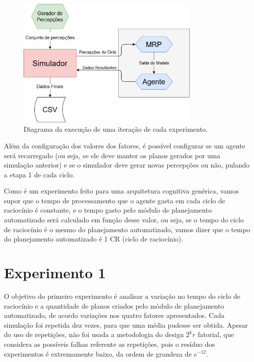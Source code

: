 \begin{figure}[h!]
    \centering
    \includegraphics[width=0.8\textwidth]{Images/diagrama-simulacao.png}
    \caption{Diagrama da execução de uma iteração de cada experimento.}
    \label{fig:diagrama-simulacao}
\end{figure}

Além da configuração dos valores dos fatores, é possível configurar se um agente será recarregado (ou seja, se ele deve manter os planos gerados por uma simulação anterior) e se o simulador deve gerar novas percepções ou não, pulando a etapa 1 de cada ciclo.

Como é um experimento feito para uma arquitetura cognitiva genérica, vamos supor que o tempo de processamento que o agente gasta em cada ciclo de raciocínio é constante, e o tempo gasto pelo módulo de planejamento automatizado será calculado em função desse valor, ou seja, se o tempo do ciclo de raciocínio é o mesmo do planejamento automatizado, vamos dizer que o tempo do planejamento automatizado é 1 CR (ciclo de raciocínio).

\section{Experimento 1}

O objetivo do primeiro experimento é analisar a variação no tempo do ciclo de raciocínio e a quantidade de planos criados pelo módulo de planejamento automatizado, de acordo variações nos quatro fatores apresentados. Cada simulação foi repetida dez vezes, para que uma média pudesse ser obtida. Apesar do uso de repetições, não foi usada a metodologia do design $2^k r$ fatorial, que considera as possíveis falhas referente as repetições, pois o resíduo dos experimentos é extremamente baixo, da ordem de grandeza de $e^{-12}$.

